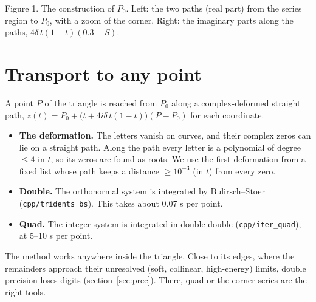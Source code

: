 \documentclass[11pt]{article}
\begin{document}
\begin{center}
\end{center}
\noindent Figure 1. The construction of $P_0$. Left: the two paths (real part) from the series region to $P_0$, with a
zoom of the corner. Right: the imaginary parts along the paths, $4\delta\,t(1-t)(0.3-S)$.

\section{Transport to any point}
A point $P$ of the triangle is reached from $P_0$ along a complex-deformed straight path,
$z(t)=P_0+\big(t+4i\delta\,t(1-t)\big)(P-P_0)$ for each coordinate.
\begin{itemize}
\item \textbf{The deformation.} The letters vanish on curves, and their complex zeros can lie on a straight path. Along
  the path every letter is a polynomial of degree $\le4$ in $t$, so its zeros are found as roots. We use the first
  deformation from a fixed list whose path keeps a distance $\ge10^{-3}$ (in $t$) from every zero.
\item \textbf{Double.} The orthonormal system is integrated by Bulirsch--Stoer (\texttt{cpp/tridents\_bs}). This takes
  about 0.07 s per point.
\item \textbf{Quad.} The integer system is integrated in double-double (\texttt{cpp/iter\_quad}), at 5--10 s per point.
\end{itemize}
The method works anywhere inside the triangle. Close to its edges, where the remainders approach their unresolved
(soft, collinear, high-energy) limits, double precision loses digits (section~\ref{sec:prec}). There, quad or the corner
series are the right tools.
\end{document}
